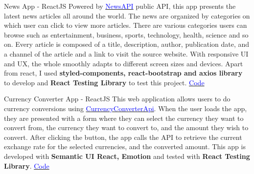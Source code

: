     {News App}
    {-}
    {ReactJS}
    {}
    {Powered by \href{https://newsapi.org/}{\textcolor{blue}{NewsAPI}} public API, this app presents the latest news articles all around the world. The news are organized by categories on which user can click to view more articles. There are various categories users can browse such as entertainment, business, sports, technology, health, science and so on. Every article is composed of a title, description, author, publication date, and a channel of the article and a link to visit the source website. With responsive UI and UX, the whole smoothly adapts to different screen sizes and devices. Apart from react, I used \textbf{styled-components, react-bootstrap and axios library} to develop and \textbf{React Testing Library} to test this project. 
        \hfill
        \href{https://github.com/simranlotey/react-news-app.git}{\textcolor{blue}{\scriptsize Code}}
    }
    \vspace*{0.2\baselineskip}


    {Currency Converter App}
    {-}
    {ReactJS}
    {}
    {This web application allows users to do currency conversions using \href{https://www.currencyconverterapi.com/}{\textcolor{blue}{CurrencyConverterApi}}. When the user loads the app, they are presented with a form where they can select the currency they want to convert from, the currency they want to convert to, and the amount they wish to convert. After clicking the button, the app calls the API to retrieve the current exchange rate for the selected currencies, and the converted amount. This app is developed with \textbf{Semantic UI React, Emotion} and tested with \textbf{React Testing Library}.
        \hfill
        \href{https://github.com/simranlotey/react-currency-converter.git}{\textcolor{blue}{\scriptsize Code}}
    }
    \vspace*{0.2\baselineskip}
